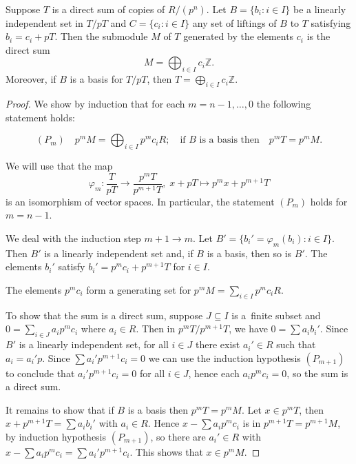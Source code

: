 \documentclass[10pt,a4paper]{amsart}
\begin{document}
\begin{lem}
  Suppose $T$ is a direct sum of copies of $R/(p^n)$.
  Let $B=\{b_i:i\in I\}$ be a linearly independent set in $T/pT$
  and $C=\{c_i:i\in I\}$ any set of liftings of $B$ to $T$ satisfying $b_i=c_i+pT$.
  Then the submodule $M$ of $T$
  generated by the elements $c_i$ is the direct sum
  $$M=\bigoplus_{i\in I}c_i \mathbb Z.$$
  Moreover, if $B$ is a basis for $T/pT$, then $T=\bigoplus_{i\in I} c_i\mathbb Z$.
\label{lem-GT}\end{lem}

\begin{proof}
  We show by induction that for each $m=n-1,\ldots,0$ the following statement holds:

  $$(P_m) \quad p^mM=\bigoplus_{i\in I} p^mc_iR; \quad\text{if $B$ is a basis then}\quad
  p^mT=p^mM.$$

  We will use that the map
  $$\varphi_m: \frac{T}{pT}\to\frac{p^mT}{p^{m+1}T}, \;x+pT\mapsto p^mx+p^{m+1}T$$
  is an isomorphism of vector spaces.  In particular, the statement $(P_m)$ holds
  for $m=n-1$.


  We deal with the induction step $m+1\to m$.
  Let $B'=\{b_i'=\varphi_m(b_i)  :i\in I\}$.
  Then $B'$ is a linearly independent set and, if $B$ is a basis, then so is $B'$.
  The elements $b_i'$ satisfy $b_i'=p^mc_i+p^{m+1}T$ for $i\in I$.


  The elements $p^mc_i$ form a generating set for $p^mM=\sum_{i\in I}p^mc_iR$.


  To show that the sum is a direct sum, suppose $J\subseteq I$ is a~finite subset
  and $0=\sum_{i\in J} a_ip^mc_i$ where
  $a_i\in R$.   Then in $p^mT/p^{m+1}T$, we have
  $0=\sum a_ib_i'$.  Since  $B'$ is a linearly independent set,
  for all $i\in J$ there exist $a_i'\in R$ such that $a_i=a_i'p$.
  Since $\sum a_i'p^{m+1}c_i=0$ we can use the induction hypothesis $(P_{m+1})$ to conclude
  that $a_i'p^{m+1}c_i=0$ for all $i\in J$, hence each $a_ip^mc_i=0$, so
  the sum is a direct sum.


  It remains to show that if $B$ is a basis then $p^mT=p^mM$.
  Let $x\in p^mT$, then $x+p^{m+1}T=\sum a_ib_i'$ with $a_i\in R$.
  Hence $x-\sum a_ip^mc_i$ is in $p^{m+1}T=p^{m+1}M$, by induction hypothesis $(P_{m+1})$,
  so there are
  $a_i'\in R$ with $x-\sum a_ip^mc_i=\sum a_i'p^{m+1}c_i$.
  This shows that $x\in p^mM$.
\end{proof}
\end{document}

